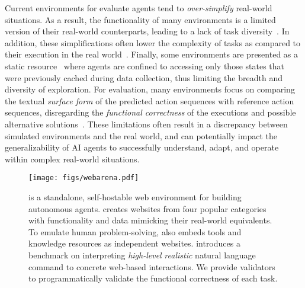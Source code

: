 Current environments for evaluate agents tend to \emph{over-simplify} real-world situations. %
As a result, the functionality of many environments is a limited version of their real-world counterparts, leading to a lack of task diversity~\citep{shi2017world,anderson_vision-and-language_2018,gordon2018iqa,misra2016tell,shridhar_alfred:_2019,shridhar_alfworld_2020,yao2022webshop}.
In addition, these simplifications often lower the complexity of tasks as compared to their execution in the real world~\citep{puig_virtualhome:_2018,shridhar_alfred:_2019,yao2022webshop}. 
Finally, some environments are presented as a static resource~\citep{shi2017world, deng2023mind2web} where agents are confined to accessing only those states that were previously cached during data collection, thus limiting the breadth and diversity of exploration.
For evaluation, many environments focus on comparing the textual \emph{surface form} of the predicted action sequences with reference action sequences, disregarding the \emph{functional correctness} of the executions and possible alternative solutions~\citep{puig_virtualhome:_2018,jernite_craftassist_2019, xu2021grounding,li2020mapping, deng2023mind2web}.
These limitations often result in a discrepancy between simulated environments and the real world, 
and can potentially impact the generalizability of AI agents to successfully understand, adapt, and operate within complex real-world situations.

\begin{figure}[t]
    \vspace{-10mm}
    \centering    \texttt{[image: figs/webarena.pdf]}
    \caption{\ours is a standalone, self-hostable web environment for building autonomous agents. 
    \ours creates websites from four popular categories with functionality and data mimicking their real-world equivalents. 
    To emulate human problem-solving, \ours also embeds tools and knowledge resources as independent websites. \ours introduces a benchmark on interpreting \emph{high-level} \emph{realistic} natural language command to concrete web-based interactions. We provide validators to programmatically validate the functional correctness of each task.}
    \label{fig:overview}
    \vspace{-4mm}
\end{figure}

